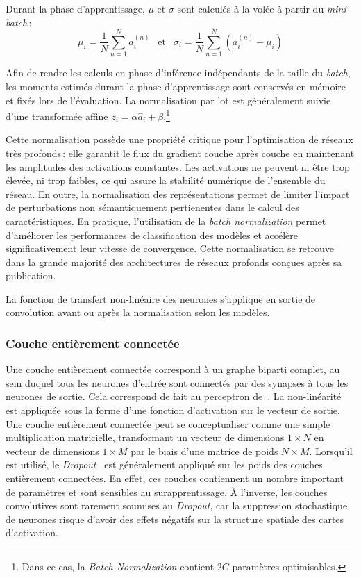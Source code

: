 Durant la phase d'apprentissage, $\mu$ et $\sigma$ sont calculés à la volée à partir du \emph{mini-batch}\,:
$$\mu_i = \frac{1}{N} \sum_{n=1}^N a_i^{(n)}~~\text{ et }~~\sigma_i = \frac{1}{N} \sum_{n=1}^N (a_i^{(n)} - \mu_i)$$

Afin de rendre les calculs en phase d'inférence indépendants de la taille du \emph{batch}, les moments estimés durant la phase d'apprentissage sont conservés en mémoire et fixés lors de l'évaluation. La normalisation par lot est généralement suivie d'une transformée affine $z_i = \alpha \hat{a}_i + \beta$.\footnote{Dans ce cas, la \emph{Batch Normalization} contient $2C$ paramètres optimisables.}

Cette normalisation possède une propriété critique pour l'optimisation de réseaux très profonds\,: elle garantit le flux du gradient couche après couche en maintenant les amplitudes des activations constantes. Les activations ne peuvent ni être trop élevée, ni trop faibles, ce qui assure la stabilité numérique de l'ensemble du réseau. En outre, la normalisation des représentations permet de limiter l'impact de perturbations non sémantiquement pertienentes dans le calcul des caractéristiques. En pratique, l'utilisation de la \emph{batch normalization} permet d'améliorer les performances de classification des modèles et accélère significativement leur vitesse de convergence. Cette normalisation se retrouve dans la grande majorité des architectures de réseaux profonds conçues après sa publication.

La fonction de transfert non-linéaire des neurones s'applique en sortie de convolution avant ou après la normalisation selon les modèles.

\subsubsection{Couche entièrement connectée}

Une couche entièrement connectée correspond à un graphe biparti complet, au sein duquel tous les neurones d'entrée sont connectés par des synapses à tous les neurones de sortie. Cela correspond de fait au perceptron de~\citet{rosenblatt_perceptron_1957}. La non-linéarité est appliquée sous la forme d'une fonction d'activation sur le vecteur de sortie. Une couche entièrement connectée peut se conceptualiser comme une simple multiplication matricielle, transformant un vecteur de dimensions $1\times{}N$ en vecteur de dimensions $1\times{}M$ par le biais d'une matrice de poids $N\times{}M$. Lorsqu'il est utilisé, le \emph{Dropout}~\cite{srivastava_dropout_2014} est généralement appliqué sur les poids des couches entièrement connectées. En effet, ces couches contiennent un nombre important de paramètres et sont sensibles au surapprentissage. À l'inverse, les couches convolutives sont rarement soumises au \emph{Dropout}, car la suppression stochastique de neurones risque d'avoir des effets négatifs sur la structure spatiale des cartes d'activation.

